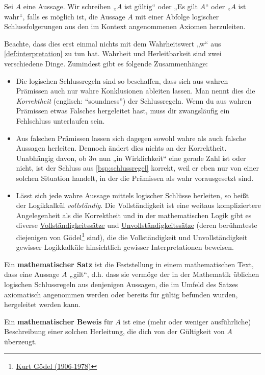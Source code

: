 \begin{defin}
    Sei $A$ eine Aussage. Wir schreiben „$A$ ist gültig“ oder „Es gilt $A$“ oder „$A$ ist wahr“, falls es möglich ist, die Aussage $A$ mit einer Abfolge logischer Schlussfolgerungen aus den im Kontext angenommenen Axiomen herzuleiten.
\end{defin}
 
 
\begin{bem} \label{beweisbarvswahr}
    Beachte, dass dies erst einmal nichts mit dem Wahrheitswert „w“ aus \cref{def:interpretation} zu tun hat. Wahrheit und Herleitbarkeit sind zwei verschiedene Dinge. Zumindest gibt es folgende Zusammenhänge:
    \begin{itemize}
        \item Die logischen Schlussregeln sind so beschaffen, dass sich aus wahren Prämissen auch nur wahre Konklusionen ableiten lassen. Man nennt dies die \emph{Korrektheit} (englisch: ``soundness'') der Schlussregeln. Wenn du aus wahren Prämissen etwas Falsches hergeleitet hast, muss dir zwangsläufig ein Fehlschluss unterlaufen sein.
        \item Aus falschen Prämissen lassen sich dagegen sowohl wahre als auch falsche Aussagen herleiten. Dennoch ändert dies nichts an der Korrektheit. Unabhängig davon, ob $3n$ nun „in Wirklichkeit“ eine gerade Zahl ist oder nicht, ist der Schluss aus \cref{bsp:schlussregel} korrekt, weil er eben nur von einer solchen Situation handelt, in der die Prämissen als wahr vorausgesetzt sind.
        \item Lässt sich jede wahre Aussage mittels logischer Schlüsse herleiten, so heißt der Logikkalkül \emph{vollständig}. Die Vollständigkeit ist eine weitaus kompliziertere Angelegenheit als die Korrektheit und in der mathematischen Logik gibt es diverse \href{https://ncatlab.org/nlab/show/completeness+theorem}{Vollständigkeitssätze} und \href{https://ncatlab.org/nlab/show/incompleteness+theorem}{Unvollständigkeitssätze} (deren berühmteste diejenigen von Gödel\footnote{\href{https://de.wikipedia.org/wiki/Kurt_G\%C3\%B6del}{Kurt Gödel (1906-1978)}} sind), die die Vollständigkeit und Unvollständigkeit gewisser Logikkalküle hinsichtlich gewisser Interpretationen beweisen.
    \end{itemize}
\end{bem}


\begin{defin} 
    Ein \textbf{mathematischer Satz} ist die Feststellung in einem mathematischen Text, dass eine Aussage $A$ „gilt“, d.h. dass sie vermöge der in der Mathematik üblichen logischen Schlussregeln aus denjenigen Aussagen, die im Umfeld des Satzes axiomatisch angenommen werden oder bereits für gültig befunden wurden, hergeleitet werden kann.
    
    Ein \textbf{mathematischer Beweis} für $A$ ist eine (mehr oder weniger ausführliche) Beschreibung einer solchen Herleitung, die dich von der Gültigkeit von $A$ überzeugt.
\end{defin}


